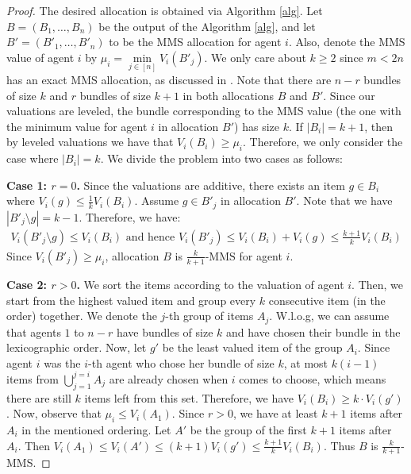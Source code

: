 \documentclass{article}
\theoremstyle{definition}
\begin{document}
\begin{proof}
    The desired allocation is obtained via Algorithm \ref{alg}. Let $B = (B_1, \ldots, B_n)$ be the output of the Algorithm \ref{alg}, and let $B' = (B'_1, \ldots, B'_n)$ to be the MMS allocation for agent $i$. Also, denote the MMS value of agent $i$ by $\mu_i = \min\limits_{j \in [n]} V_i(B'_j)$. We only care about $k \ge 2$ since $m < 2n$  has an exact MMS allocation, as discussed in \cite{christodoulou2024fairtruthfulallocationsleveled}. Note that there are $n - r$ bundles of size $k$ and $r$ bundles of size $k + 1$ in both allocations $B$ and $B'$. Since our valuations are leveled, the bundle corresponding to the MMS value (the one with the minimum value for agent $i$ in allocation $B'$) has size $k$. If $|B_i| = k + 1$, then by leveled valuations we have that $V_i(B_i) \ge \mu_i$. Therefore, we only consider the case where $|B_i| = k$. We divide the problem into two cases as follows:

    \textbf{Case 1: $r = 0$.} Since the valuations are additive, there exists an item $g \in B_i$ where $V_i(g) \le \frac{1}{k} V_i (B_i)$. Assume $g \in B'_j$ in allocation $B'$. Note that we have $|B'_j \setminus g| = k - 1$. Therefore, we have:
    \begin{align*}
        V_i(B'_j \setminus g) \le V_i(B_i) \text{ and hence } V_i(B'_j) \le V_i(B_i) + V_i(g) \le \frac{k + 1}{k} V_i(B_i)
    \end{align*}
     Since $V_i(B'_j) \ge \mu_i$, allocation $B$ is $\frac{k}{k + 1}\text{-MMS}$ for agent $i$.

    \textbf{Case 2: $r > 0$.} We sort the items according to the valuation of agent $i$. Then, we start from the highest valued item and group every $k$ consecutive item (in the order) together. We denote the $j$-th group of items $A_j$. W.l.o.g, we can assume that agents $1$ to $n - r$ have bundles of size $k$ and have chosen their bundle in the lexicographic order.
    Now, let $g'$ be the least valued item of the group $A_i$. Since agent $i$ was the $i$-th agent who chose her bundle of size $k$, at most $k(i - 1)$ items from $\bigcup\limits_{j = 1}^{j = i} A_j$ are already chosen when $i$ comes to choose, which means there are still $k$ items left from this set. Therefore, we have  $V_i(B_i) \ge k \cdot V_i(g')$. Now, observe that $\mu_i \le V_i(A_1)$. Since $r > 0$, we have at least $k + 1$ items after $A_i$ in the mentioned ordering. Let $A'$ be the group of the first $k + 1$ items after $A_i$. Then $V_i(A_1) \le V_i(A') \le (k + 1) V_i(g') \le \frac{k+1}{k} V_i(B_i) $. Thus $B$ is $\frac{k}{k+1}$-MMS. 
\end{proof}
\end{document}
